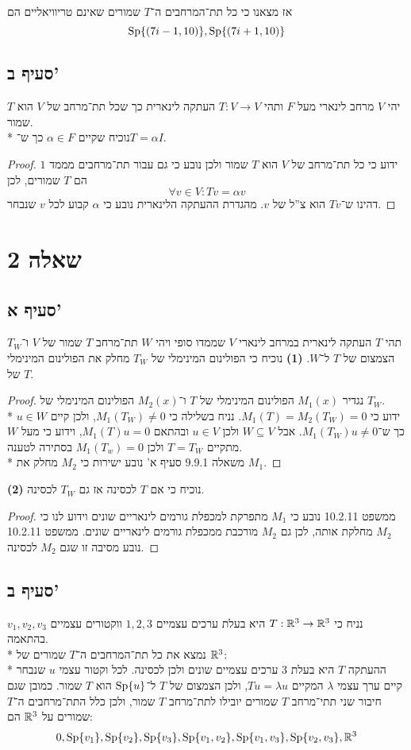 אז מצאנו כי כל תת־המרחבים ה־$T$ שמורים שאינם טריוויאליים הם
\[
	\operatorname{Sp}\{ (7i - 1, 10) \},
	\operatorname{Sp}\{ (7i + 1, 10) \}
\]

\subsection{סעיף ב'}
יהי $V$ מרחב לינארי מעל $F$ ותהי $T : V \to V$ העתקה לינארית כך שכל תת־מרחב של $V$ הוא $T$ שמור. \\*
נוכיח שקיים $\alpha \in F$ כך ש־$T = \alpha I$.
\begin{proof}
	ידוע כי כל תת־מרחב של $V$ הוא $T$ שמור ולכן נובע כי גם עבור תת־מרחבים מממד $1$ הם $T$ שמורים, לכן
	\[
		\forall v \in V: T v = \alpha v
	\]
	דהינו ש־$T v$ הוא צ''ל של $v$. מהגדרת ההעתקה הלינארית נובע כי $\alpha$ קבוע לכל $v$ שנבחר.
\end{proof}

\section{שאלה 2}
\subsection{סעיף א'}
תהי $T$ העתקה לינארית במרחב לינארי $V$ שממדו סופי ויהי $W$ תת־מרחב $T$ שמור של $V$ ו־$T_W$ הצמצום של $T$ ל־$W$.
\textbf{(1)}
נוכיח כי הפולינום המינימלי של $T_W$ מחלק את הפולינום המינימלי של $T$.
\begin{proof}
	נגדיר $M_1(x)$ הפולינום המינימלי של $T$ ו־$M_2(x)$ הפולינום המינימלי של $T_W$. \\*
	ידוע כי $M_1(T) = M_2(T_W) = 0$. נניח בשלילה כי $M_1(T_W) \ne 0$, ולכן קיים $u \in W$ כך ש־$M_1(T_W) u \ne 0$.
	אבל $W \subseteq V$ ולכן $u \in V$ ובהתאם $M_1(T) u = 0$, וידוע כי מעל $W$ מתקיים $T = T_W$ ולכן $M_1(T_w) = 0$ בסתירה לטענה. \\*
	משאלה 9.9.1 סעיף א' נובע ישירות כי $M_2$ מחלק את $M_1$.
\end{proof}
\textbf{(2)}
נוכיח כי אם $T$ לכסינה אז גם $T_W$ לכסינה.
\begin{proof}
	ממשפט 10.2.11 נובע כי $M_1$ מתפרקת למכפלת גורמים לינאריים שונים וידוע לנו כי $M_2$ מחלקת אותה,
	לכן גם $M_2$ מורכבת ממכפלת גורמים לינאריים שונים. ממשפט 10.2.11 נובע מסיבה זו שגם $M_2$ לכסינה.
\end{proof}

\subsection{סעיף ב'}
נניח כי $T : \mathbb{R}^3 \to \mathbb{R}^3$ היא בעלת ערכים עצמיים $1, 2, 3$ ווקטורים עצמיים $v_1, v_2, v_3$ בהתאמה. \\*
נמצא את כל תת־המרחבים ה־$T$ שמורים של $\mathbb{R}^3$: \\*
ההעתקה $T$ היא בעלת $3$ ערכים עצמיים שונים ולכן לכסינה. לכל וקטור עצמי $u$ שנבחר קיים ערך עצמי $\lambda$ המקיים $T u = \lambda u$,
ולכן הצמצום של $T$ ל־$\operatorname{Sp}\{ u \}$ הוא $T$ שמור.
כמובן שגם חיבור שני תתי־מרחב $T$ שמורים יובילו לתת־מרחב $T$ שמור, ולכן כלל התת־מרחבים ה־$T$ שמורים על $\mathbb{R}^3$ הם:
\[
	0,
	\operatorname{Sp}\{ v_1 \},
	\operatorname{Sp}\{ v_2 \},
	\operatorname{Sp}\{ v_3 \},
	\operatorname{Sp}\{ v_1, v_2 \},
	\operatorname{Sp}\{ v_1, v_3 \},
	\operatorname{Sp}\{ v_2, v_3 \},
	\mathbb{R}^3
\]

